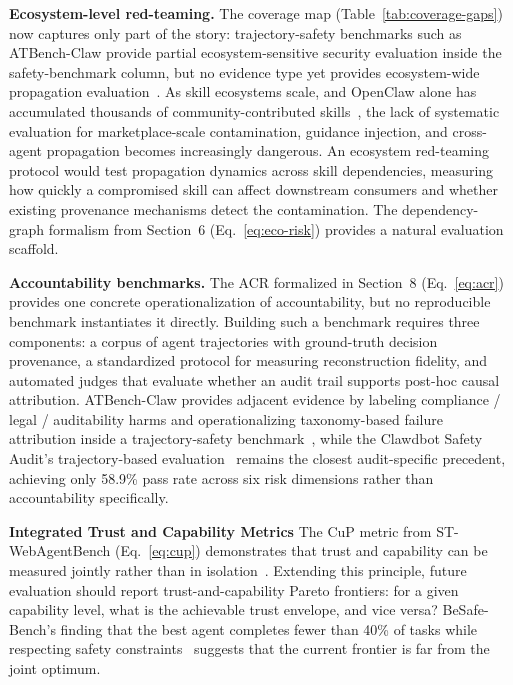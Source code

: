 \smallskip
\noindent\textbf{Ecosystem-level red-teaming.}
The coverage map (Table~\ref{tab:coverage-gaps}) now captures only part of the story: trajectory-safety benchmarks such as ATBench-Claw provide partial ecosystem-sensitive security evaluation inside the safety-benchmark column, but no evidence type yet provides ecosystem-wide propagation evaluation~\cite{atbenchclaw2026}. As skill ecosystems scale, and OpenClaw alone has accumulated thousands of community-contributed skills~\cite{openclaw2026}, the lack of systematic evaluation for marketplace-scale contamination, guidance injection, and cross-agent propagation becomes increasingly dangerous. An ecosystem red-teaming protocol would test propagation dynamics across skill dependencies, measuring how quickly a compromised skill can affect downstream consumers and whether existing provenance mechanisms detect the contamination. The dependency-graph formalism from Section~6 (Eq.~\ref{eq:eco-risk}) provides a natural evaluation scaffold.

\smallskip
\noindent\textbf{Accountability benchmarks.}
The ACR formalized in Section~8 (Eq.~\ref{eq:acr}) provides one concrete operationalization of accountability, but no reproducible benchmark instantiates it directly. Building such a benchmark requires three components: a corpus of agent trajectories with ground-truth decision provenance, a standardized protocol for measuring reconstruction fidelity, and automated judges that evaluate whether an audit trail supports post-hoc causal attribution. ATBench-Claw provides adjacent evidence by labeling compliance / legal / auditability harms and operationalizing taxonomy-based failure attribution inside a trajectory-safety benchmark~\cite{atbenchclaw2026}, while the Clawdbot Safety Audit's trajectory-based evaluation~\cite{clawaudit2026} remains the closest audit-specific precedent, achieving only 58.9\% pass rate across six risk dimensions rather than accountability specifically.

\smallskip
\noindent\textbf{Integrated Trust and Capability Metrics}
The CuP metric from ST-WebAgentBench (Eq.~\ref{eq:cup}) demonstrates that trust and capability can be measured jointly rather than in isolation~\cite{stwebagentbench2025}. Extending this principle, future evaluation should report trust-and-capability Pareto frontiers: for a given capability level, what is the achievable trust envelope, and vice versa? BeSafe-Bench's finding that the best agent completes fewer than 40\% of tasks while respecting safety constraints~\cite{besafebench2026} suggests that the current frontier is far from the joint optimum.

